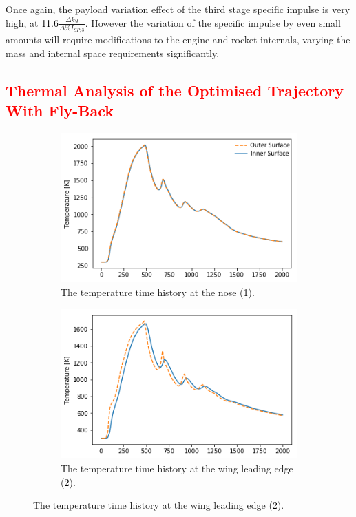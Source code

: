 Once again, the payload variation effect of the third stage specific impulse is very high, at \textcolor{black}{11.6}$\frac{\Delta kg}{\Delta\%I_{SP,3}}$. However the variation of the specific impulse by even small amounts will require modifications to the engine and rocket internals, varying the mass and internal space requirements significantly.



\textcolor{red}{
	\section{Thermal Analysis of the Optimised Trajectory With Fly-Back}\label{sec:therm3}
}
\begin{figure}[!ht]
	\begin{subfigure}{.5\textwidth}
		\centering
		\includegraphics[width=0.99\linewidth]{figures/A1_uncertainty-analysis/TNoseReturn}
		\caption{The temperature time history at the nose (\textcolor{black}{1}).}
		
	\end{subfigure}
	\begin{subfigure}{.5\textwidth}
		\centering
		\includegraphics[width=0.99\linewidth]{figures/A1_uncertainty-analysis/TLEReturn}
		\caption{The temperature time history at the wing leading edge (\textcolor{black}{2}).}
		

\end{subfigure}
\end{figure}
